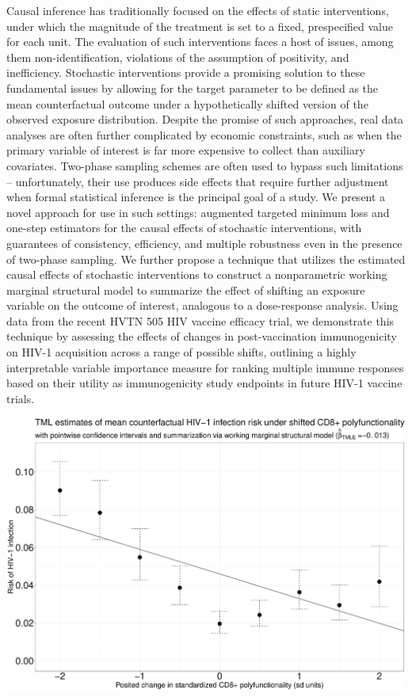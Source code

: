 \documentclass[]{elsarticle} %
\makeatletter
\def\maxwidth{\ifdim\Gin@nat@width>\linewidth\linewidth
\else\Gin@nat@width\fi}
\let\Oldincludegraphics\includegraphics
\renewcommand{\includegraphics}[1]{\Oldincludegraphics[width=\maxwidth]{#1}}
\makeatother
\begin{document}
Causal inference has traditionally focused on the effects of static
interventions, under which the magnitude of the treatment is set to a
fixed, prespecified value for each unit. The evaluation of such
interventions faces a host of issues, among them non-identification,
violations of the assumption of positivity, and inefficiency. Stochastic
interventions provide a promising solution to these fundamental issues
by allowing for the target parameter to be defined as the mean
counterfactual outcome under a hypothetically shifted version of the
observed exposure distribution. Despite the promise of such approaches,
real data analyses are often further complicated by economic
constraints, such as when the primary variable of interest is far more
expensive to collect than auxiliary covariates. Two-phase sampling
schemes are often used to bypass such limitations -- unfortunately,
their use produces side effects that require further adjustment when
formal statistical inference is the principal goal of a study. We
present a novel approach for use in such settings: augmented targeted
minimum loss and one-step estimators for the causal effects of
stochastic interventions, with guarantees of consistency, efficiency,
and multiple robustness even in the presence of two-phase sampling. We
further propose a technique that utilizes the estimated causal effects
of stochastic interventions to construct a nonparametric working
marginal structural model to summarize the effect of shifting an
exposure variable on the outcome of interest, analogous to a
dose-response analysis. Using data from the recent HVTN 505 HIV vaccine
efficacy trial, we demonstrate this technique by assessing the effects
of changes in post-vaccination immunogenicity on HIV-1 acquisition
across a range of possible shifts, outlining a highly interpretable
variable importance measure for ranking multiple immune responses based
on their utility as immunogenicity study endpoints in future HIV-1
vaccine trials.

\newpage

\includegraphics{./cd8_msm_tmle_summary.pdf}
\end{document}
